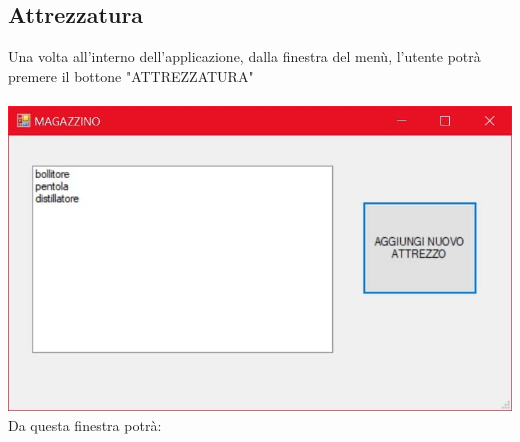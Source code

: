 \documentclass[a4paper, titlepage]{article}
\begin{document}
\subsection{Attrezzatura}
Una volta all'interno dell'applicazione, dalla finestra del menù, l'utente potrà premere il bottone "ATTREZZATURA"\\\\
\includegraphics[scale=0.30]{Immagini/form/Form GestioneAttrezzatura.jpg}
\\Da questa finestra potrà:
\end{document}
